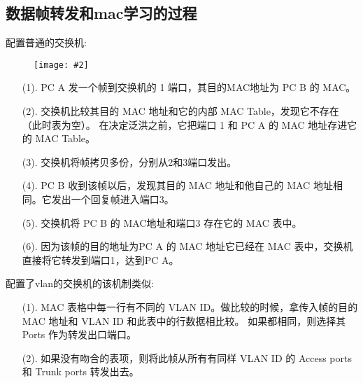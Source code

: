 \documentclass[a4paper,left=1.5cm,right=1.5cm,11pt]{article}
\newcommand{\sizedfic}[2]{\begin{figure}[H]
		\center
		\texttt{[image: \#2]}
	\end{figure}}
\begin{document}
\subsection{数据帧转发和mac学习的过程}
配置普通的交换机:
\sizedfic{0.8}{mac学习.jpg}
\begin{itemize}
	\item[(1).]PC A 发一个帧到交换机的 1 端口，其目的MAC地址为 PC B 的 MAC。
	\item[(2).]交换机比较其目的 MAC 地址和它的内部 MAC Table，发现它不存在（此时表为空）。
	在决定泛洪之前，它把端口 1 和 PC A 的 MAC 地址存进它的 MAC Table。
	\item[(3).]交换机将帧拷贝多份，分别从2和3端口发出。
	\item[(4).]PC B 收到该帧以后，发现其目的 MAC 地址和他自己的 MAC 地址相同。它发出一个回复帧进入端口3。
	\item[(5).]交换机将 PC B 的 MAC地址和端口3 存在它的 MAC 表中。
	\item[(6).]因为该帧的目的地址为PC A 的 MAC 地址它已经在 MAC 表中，交换机直接将它转发到端口1，达到PC A。
\end{itemize}
配置了vlan的交换机的该机制类似:
\begin{itemize}
	\item[(1).]MAC 表格中每一行有不同的 VLAN ID。做比较的时候，拿传入帧的目的 MAC 地址和 VLAN ID 和此表中的行数据相比较。
	如果都相同，则选择其 Ports 作为转发出口端口。
	\item[(2).]如果没有吻合的表项，则将此帧从所有有同样 VLAN ID 的 Access ports 和 Trunk ports 转发出去。
\end{itemize}
\end{document}
